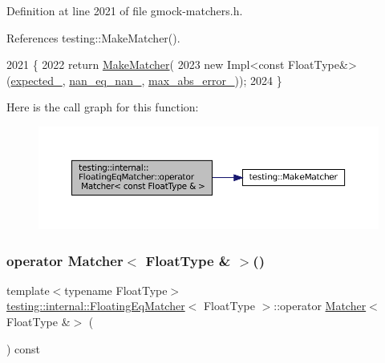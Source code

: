 Definition at line 2021 of file gmock-\/matchers.\+h.



References testing\+::\+Make\+Matcher().


\begin{DoxyCode}
2021                                              \{
2022     \textcolor{keywordflow}{return} \hyperlink{namespacetesting_a37fd8029ac00e60952440a3d9cca8166}{MakeMatcher}(
2023         \textcolor{keyword}{new} Impl<const FloatType&>(\hyperlink{classtesting_1_1internal_1_1FloatingEqMatcher_a01d4d3ee6344cd3d88c53dd6e730b9df}{expected\_}, \hyperlink{classtesting_1_1internal_1_1FloatingEqMatcher_a782b06cb55b4989c3c67facf910265bf}{nan\_eq\_nan\_}, 
      \hyperlink{classtesting_1_1internal_1_1FloatingEqMatcher_a06b3fd6f9ee60bc694a12ccaeba2924a}{max\_abs\_error\_}));
2024   \}
\end{DoxyCode}
Here is the call graph for this function\+:
\nopagebreak
\begin{figure}[H]
\begin{center}
\leavevmode
\includegraphics[width=350pt]{classtesting_1_1internal_1_1FloatingEqMatcher_a5419859a104ad44ce6c35732efebc694_cgraph}
\end{center}
\end{figure}
\mbox{\label{classtesting_1_1internal_1_1FloatingEqMatcher_ae75e5b64f04010c5580312562fcf98e5}} 
\subsubsection{\texorpdfstring{operator Matcher$<$ Float\+Type \& $>$()}{operator Matcher< FloatType \& >()}}
{\footnotesize\ttfamily template$<$typename Float\+Type$>$ \\
\hyperlink{classtesting_1_1internal_1_1FloatingEqMatcher}{testing\+::internal\+::\+Floating\+Eq\+Matcher}$<$ Float\+Type $>$\+::operator \hyperlink{classtesting_1_1Matcher}{Matcher}$<$ Float\+Type \&$>$ (\begin{DoxyParamCaption}{ }\end{DoxyParamCaption}) const\hspace{0.3cm}{\ttfamily [inline]}}



